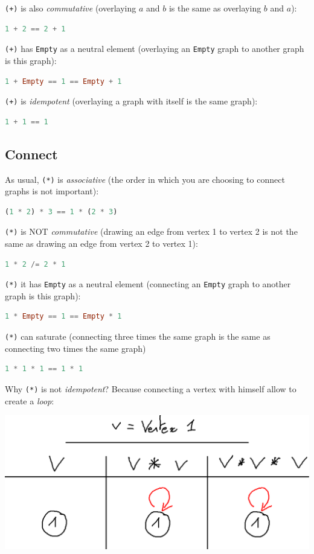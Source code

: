 \documentclass[10pt,a4paper]{article}
\begin{document}
\verb|(+)| is also \emph{commutative} (overlaying $a$ and $b$ is the same as overlaying $b$ and $a$):
\begin{lstlisting}[language=Haskell, frame=single]
1 + 2 == 2 + 1
\end{lstlisting}

\verb|(+)| has \verb|Empty| as a neutral element (overlaying an \verb|Empty| graph to another graph is this graph):
\begin{lstlisting}[language=Haskell, frame=single]
1 + Empty == 1 == Empty + 1
\end{lstlisting}

\verb|(+)| is \emph{idempotent} (overlaying a graph with itself is the same graph):
\begin{lstlisting}[language=Haskell, frame=single]
1 + 1 == 1
\end{lstlisting}

\subsection{Connect}
As usual, \verb|(*)| is \emph{associative} (the order in which you are choosing to connect graphs is not important):
\begin{lstlisting}[language=Haskell, frame=single]
(1 * 2) * 3 == 1 * (2 * 3)
\end{lstlisting}

\verb|(*)| is NOT \emph{commutative} (drawing an edge from vertex 1 to vertex 2 is not the same as drawing an edge from vertex 2 to vertex 1):
\begin{lstlisting}[language=Haskell, frame=single]
1 * 2 /= 2 * 1
\end{lstlisting}

\verb|(*)| it has \verb|Empty| as a neutral element (connecting an \verb|Empty| graph to another graph is this graph):
\begin{lstlisting}[language=Haskell, frame=single]
1 * Empty == 1 == Empty * 1
\end{lstlisting}

\verb|(*)| can saturate (connecting three times the same graph is the same as connecting two times the same graph)
\begin{lstlisting}[language=Haskell, frame=single]
1 * 1 * 1 == 1 * 1
\end{lstlisting}

Why \verb|(*)| is not \emph{idempotent}? Because connecting a vertex with himself allow to create a \emph{loop}:

\begin{center}
	\includegraphics[scale=0.5]{figspng/saturate.png}
\end{center}
\end{document}

